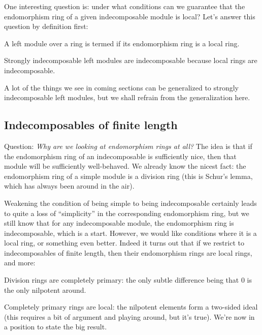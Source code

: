 \documentclass[a4paper]{amsart}
\begin{document}
One interesting question is: under what conditions can we guarantee
that the endomorphism ring of a given indecomposable module is local?
Let's answer this question by definition first:

\begin{definer}
  A left module over a ring is termed 
  if its endomorphism ring is a local ring.
\end{definer}

Strongly indecomposable left modules are indecomposable because local rings
are indecomposable.

A lot of the things we see in coming sections can be generalized to
strongly indecomposable left modules, but we shall refrain from the
generalization here.

\subsection{Indecomposables of finite length}

Question: {\em Why are we looking at endomorphism rings at all?} The
idea is that if the endomorphism ring of an indecomposable is
sufficiently nice, then that module will be sufficiently
well-behaved. We already know the nicest fact: the endomorphism ring
of a simple module is a division ring (this is Schur's lemma, which
has always been around in the air).

Weakening the condition of being simple to being indecomposable
certainly leads to quite a loss of ``simplicity'' in the corresponding
endomorphism ring, but we still know that for any indecomposable
module, the endomorphism ring is indecomposable, which is a
start. However, we would like conditions where it is a local ring, or
something even better. Indeed it turns out that if we restrict to
indecomposables of finite length, then their endomorphism rings are
local rings, and more:

\begin{definer}
\end{definer}

Division rings are completely primary: the only subtle difference
being that $0$ is the only nilpotent around.

Completely primary rings are local: the nilpotent elements form a
two-sided ideal (this requires a bit of argument and playing around,
but it's true). We're now in a position to state the big result.
\end{document}
